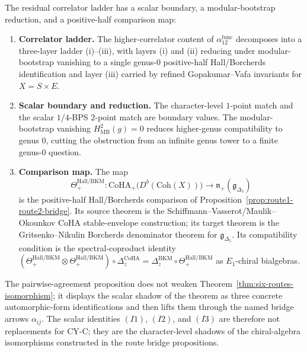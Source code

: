 \begin{remark}
\label{rem:prop-hm-functorial-residual-triple}
The residual correlator ladder has a scalar boundary, a modular-bootstrap
reduction, and a positive-half comparison map:
\begin{enumerate}[label=\textup{(\alph*)}]
 \item \textbf{Correlator ladder.} The higher-correlator content of $\alpha_{12}^{\mathrm{func}}$ decomposes into a three-layer ladder (i)--(iii), with layers (i) and (ii) reducing under modular-bootstrap vanishing to a single genus-$0$ positive-half Hall/Borcherds identification and layer (iii) carried by refined Gopakumar--Vafa invariants for \(X=S\times E\).
 \item \textbf{Scalar boundary and reduction.} The character-level $1$-point match and the scalar $1/4$-BPS $2$-point match are boundary values. The modular-bootstrap vanishing \(H^2_{\mathrm{MB}}(g)=0\) reduces higher-genus compatibility to genus \(0\), cutting the obstruction from an infinite genus tower to a finite genus-\(0\) question.
 \item \textbf{Comparison map.} The map
 \[
 \Theta_{+}^{\mathrm{Hall/BKM}}\colon
 \mathrm{CoHA}_{+}\bigl(D^b(\mathrm{Coh}(X))\bigr)
 \longrightarrow
 \mathfrak{n}_{+}(\mathfrak{g}_{\Delta_5})
 \]
 is the positive-half Hall/Borcherds comparison of
 Proposition~\ref{prop:route1-route2-bridge}. Its source theorem is
 the Schiffmann--Vasserot/Maulik--Okounkov CoHA stable-envelope
 construction; its target theorem is the Gritsenko--Nikulin
 Borcherds denominator theorem for $\mathfrak{g}_{\Delta_5}$. Its
 compatibility condition is the spectral-coproduct identity
 $(\Theta_{+}^{\mathrm{Hall/BKM}}\otimes
 \Theta_{+}^{\mathrm{Hall/BKM}})\circ\Delta_z^{\mathrm{CoHA}}
 =\Delta_z^{\mathrm{BKM}}\circ\Theta_{+}^{\mathrm{Hall/BKM}}$ as
 $E_1$-chiral bialgebras.
\end{enumerate}
\end{remark}

\begin{remark}
\label{rem:cy-c-three-identity-factorisation}
The pairwise-agreement proposition does not weaken
Theorem~\ref{thm:six-routes-isomorphism}; it displays the scalar
shadow of the theorem as three concrete automorphic-form identifications
and then lifts them through the named bridge arrows
$\alpha_{ij}$. The scalar identities $(I1)$, $(I2)$, and $(I3)$ are
therefore not replacements for CY-C; they are the character-level
shadows of the chiral-algebra isomorphisms constructed in the route
bridge propositions.
\end{remark}

